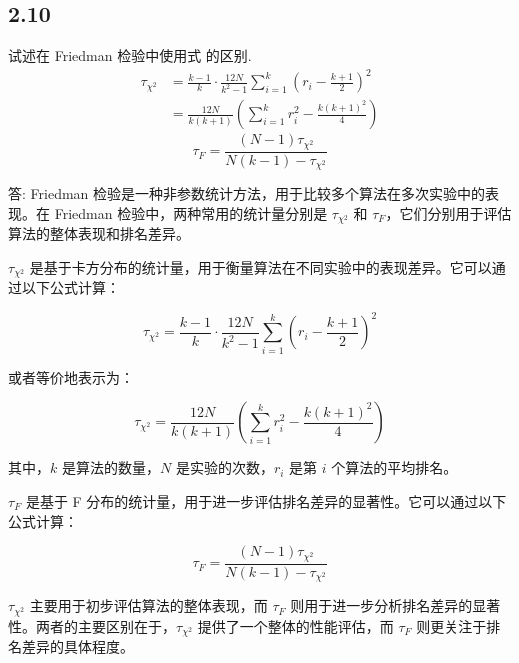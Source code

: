 \subsection*{2.10}
试述在 Friedman 检验中使用式 的区别.
\begin{align*}
    \tau_{\chi^2} &= \frac{k-1}{k} \cdot \frac{12N}{k^2-1} \sum_{i=1}^{k} \left( r_i - \frac{k+1}{2} \right)^2 \\
    &= \frac{12N}{k(k+1)} \left( \sum_{i=1}^{k} r_i^2 - \frac{k(k+1)^2}{4} \right)
\end{align*}
\begin{equation*}
    \tau_F = \frac{(N-1) \tau_{\chi^2}}{N(k-1) - \tau_{\chi^2}}
\end{equation*}
\par 答:
Friedman 检验是一种非参数统计方法，用于比较多个算法在多次实验中的表现。在 Friedman 检验中，两种常用的统计量分别是 $\tau_{\chi^2}$ 和 $\tau_F$，它们分别用于评估算法的整体表现和排名差异。

$\tau_{\chi^2}$ 是基于卡方分布的统计量，用于衡量算法在不同实验中的表现差异。它可以通过以下公式计算：

\[
\tau_{\chi^2} = \frac{k-1}{k} \cdot \frac{12N}{k^2-1} \sum_{i=1}^{k} \left( r_i - \frac{k+1}{2} \right)^2
\]

或者等价地表示为：

\[
\tau_{\chi^2} = \frac{12N}{k(k+1)} \left( \sum_{i=1}^{k} r_i^2 - \frac{k(k+1)^2}{4} \right)
\]

其中，$k$ 是算法的数量，$N$ 是实验的次数，$r_i$ 是第 $i$ 个算法的平均排名。

$\tau_F$ 是基于 F 分布的统计量，用于进一步评估排名差异的显著性。它可以通过以下公式计算：

\[
\tau_F = \frac{(N-1) \tau_{\chi^2}}{N(k-1) - \tau_{\chi^2}}
\]

$\tau_{\chi^2}$ 主要用于初步评估算法的整体表现，而 $\tau_F$ 则用于进一步分析排名差异的显著性。两者的主要区别在于，$\tau_{\chi^2}$ 提供了一个整体的性能评估，而 $\tau_F$ 则更关注于排名差异的具体程度。
\newpage
